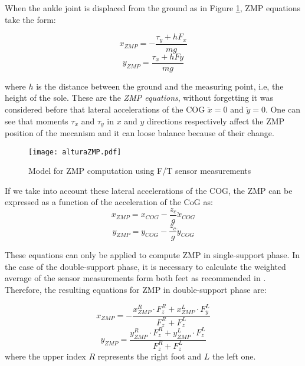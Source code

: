 When the ankle joint is displaced from the ground as in Figure \ref{fig:zmp_altura}, ZMP equations take the form:

\begin{equation}
x_{ZMP} = -\frac{\tau_y+hF_x}{mg}
\label{eq:xzmph}
\end{equation}
\begin{equation}
y_{ZMP} = \frac{\tau_x+hFy}{mg}
\label{eq:yzmph}
\end{equation}

where $h$ is the distance between the ground and the measuring point, i.e, the height of the sole. 
These are the \textit{ZMP equations}, without forgetting it was considered before that lateral accelerations of the COG $\ddot{x}=0$ and $\ddot{y}=0$. One can see that moments $\tau_x$ and $\tau_y$ in $x$ and $y$ directions respectively affect the ZMP position of the mecanism and it can loose balance because of their change.

\begin{figure}[!hbt]
\centering
\texttt{[image: alturaZMP.pdf]}
\caption{Model for ZMP computation using F/T sensor measurements}
\label{fig:zmp_altura}
\end{figure}

If we take into account these lateral accelerations of the COG, the ZMP can be expressed as a function of the acceleration of the CoG as:
\begin{equation}
x_{ZMP}=x_{COG}-\frac{z_c}{g}\ddot{x}_{COG}
\end{equation}
\begin{equation}
y_{ZMP}=y_{COG}-\frac{z_c}{g}\ddot{y}_{COG}
\end{equation}

These equations can only be applied to compute ZMP in single-support phase. In the case of the double-support phase, it is necessary to calculate the weighted average of the sensor measurements form both feet as recommended in \cite[pp. 82-83]{Kaj2005}. Therefore, the resulting equations for ZMP in double-support phase are:

\begin{equation}
x_{ZMP} = -\frac{x_{ZMP}^{R} \cdot F_{z}^{R} + x_{ZMP}^{L} \cdot F_{y}^{L}}{F_{z}^{R}+F_{z}^{L}}
\end{equation}
\begin{equation}
y_{ZMP} = \frac{y_{ZMP}^{R} \cdot F_{z}^{R} + y_{ZMP}^{L} \cdot F_{z}^{L}}{F_{z}^{R}+F_{z}^{L}}
\end{equation}
where the upper index $R$ represents the right foot and $L$ the left one.

